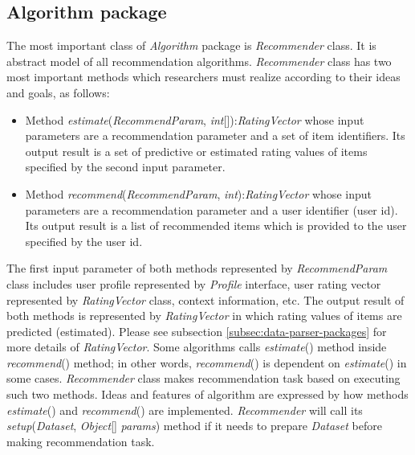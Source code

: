 \documentclass[a4paper,twoside]{article}
\begin{document}
\subsection{Algorithm package}
\label{subsec:algorithm-package}
The most important class of \textit{Algorithm} package is \textit{Recommender} class. It is abstract model of all recommendation algorithms. \textit{Recommender} class has two most important methods which researchers must realize according to their ideas and goals, as follows:
\begin{itemize}
\item Method \textit{estimate}(\textit{RecommendParam}, \textit{int}[]):\textit{RatingVector} whose input parameters are a recommendation parameter and a set of item identifiers. Its output result is a set of predictive or estimated rating values of items specified by the second input parameter.
\item Method \textit{recommend}(\textit{RecommendParam}, \textit{int}):\textit{RatingVector} whose input parameters are a recommendation parameter and a user identifier (user id). Its output result is a list of recommended items which is provided to the user specified by the user id.
\end{itemize}
The first input parameter of both methods represented by \textit{RecommendParam} class includes user profile represented by \textit{Profile} interface, user rating vector represented by \textit{RatingVector} class, context information, etc. The output result of both methods is represented by \textit{RatingVector} in which rating values of items are predicted (estimated). Please see subsection \ref{subsec:data-parser-packages} for more details of \textit{RatingVector}. Some algorithms calls \textit{estimate}() method inside \textit{recommend}() method; in other words, \textit{recommend}() is dependent on \textit{estimate}() in some cases. \textit{Recommender} class makes recommendation task based on executing such two methods. Ideas and features of algorithm are expressed by how methods \textit{estimate}() and \textit{recommend}() are implemented. \textit{Recommender} will call its \textit{setup}(\textit{Dataset}, \textit{Object}[] \textit{params}) method if it needs to prepare \textit{Dataset} before making recommendation task.
\end{document}
